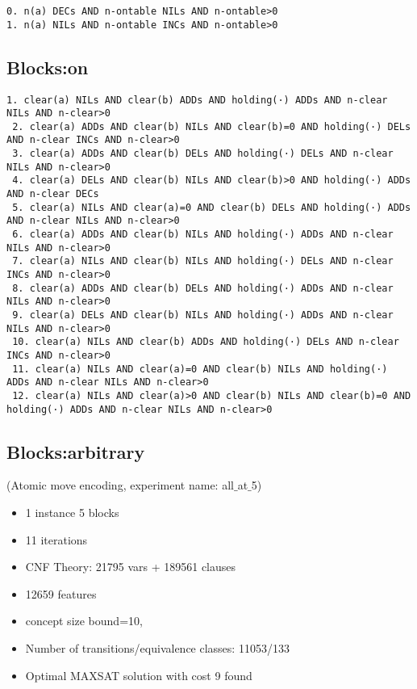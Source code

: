 \documentclass[a4paper]{article}
\begin{document}
\begin{Verbatim}[fontsize=\footnotesize]
0. n(a) DECs AND n-ontable NILs AND n-ontable>0
1. n(a) NILs AND n-ontable INCs AND n-ontable>0
\end{Verbatim}


\subsection{Blocks:on}
\begin{Verbatim}[fontsize=\footnotesize]
 1. clear(a) NILs AND clear(b) ADDs AND holding(·) ADDs AND n-clear NILs AND n-clear>0
 2. clear(a) ADDs AND clear(b) NILs AND clear(b)=0 AND holding(·) DELs AND n-clear INCs AND n-clear>0
 3. clear(a) ADDs AND clear(b) DELs AND holding(·) DELs AND n-clear NILs AND n-clear>0
 4. clear(a) DELs AND clear(b) NILs AND clear(b)>0 AND holding(·) ADDs AND n-clear DECs
 5. clear(a) NILs AND clear(a)=0 AND clear(b) DELs AND holding(·) ADDs AND n-clear NILs AND n-clear>0
 6. clear(a) ADDs AND clear(b) NILs AND holding(·) ADDs AND n-clear NILs AND n-clear>0
 7. clear(a) NILs AND clear(b) NILs AND holding(·) DELs AND n-clear INCs AND n-clear>0
 8. clear(a) ADDs AND clear(b) DELs AND holding(·) ADDs AND n-clear NILs AND n-clear>0
 9. clear(a) DELs AND clear(b) NILs AND holding(·) ADDs AND n-clear NILs AND n-clear>0
 10. clear(a) NILs AND clear(b) ADDs AND holding(·) DELs AND n-clear INCs AND n-clear>0
 11. clear(a) NILs AND clear(a)=0 AND clear(b) NILs AND holding(·) ADDs AND n-clear NILs AND n-clear>0
 12. clear(a) NILs AND clear(a)>0 AND clear(b) NILs AND clear(b)=0 AND holding(·) ADDs AND n-clear NILs AND n-clear>0
\end{Verbatim}

\subsection{Blocks:arbitrary}
(Atomic move encoding, experiment name: all$\_$at$\_$5)

\begin{itemize}
 \item 1 instance 5 blocks
 \item 11 iterations
 \item CNF Theory: 21795 vars + 189561 clauses
 \item 12659 features
 \item concept size bound=10,
 \item Number of transitions/equivalence classes: 11053/133
 \item Optimal MAXSAT solution with cost 9 found
\end{itemize}
\end{document}
